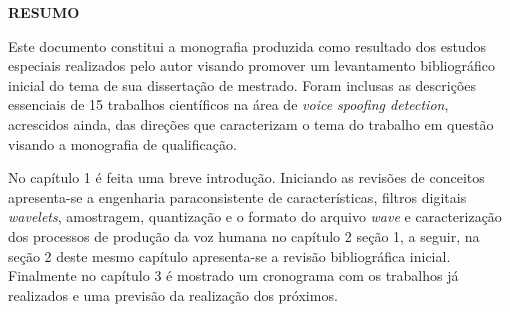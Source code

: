 
\setlength{\parindent}{0pt}
\newpage \thispagestyle{empty}
\vspace{1.5cm}
\fontsize{12}{\baselineskip} \selectfont

\begin{center}
	{\huge{\textbf{RESUMO}}}
\end{center}

\begin{myenv}{1.5}
	\fontsize{12}{\baselineskip} \selectfont \onehalfspacing
	\par \null
	\par \null
	\par Este documento constitui a monografia produzida como resultado dos estudos especiais realizados pelo autor visando promover um levantamento bibliográfico inicial do tema de sua dissertação de mestrado. Foram inclusas as descrições essenciais de 15 trabalhos científicos na área de \textit{voice spoofing detection}, acrescidos ainda, das direções que caracterizam o tema do trabalho em questão visando a monografia de qualificação.
	
	\par No capítulo 1 é feita uma breve introdução. Iniciando as revisões de conceitos apresenta-se a engenharia paraconsistente de características, filtros digitais \textit{wavelets}, amostragem,  quantização e o formato do arquivo \textit{wave} e caracterização dos processos de produção da voz humana no capítulo 2 seção 1, a seguir, na seção 2 deste mesmo capítulo apresenta-se a revisão bibliográfica inicial. Finalmente no capítulo 3 é mostrado um cronograma com os trabalhos já realizados e uma previsão da realização dos próximos.
\end{myenv}